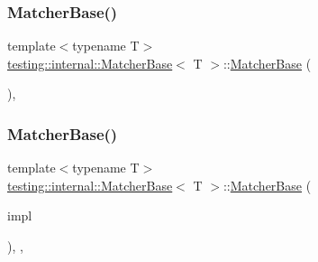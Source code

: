 \subsubsection{\texorpdfstring{Matcher\+Base()}{MatcherBase()}\hspace{0.1cm}{\footnotesize\ttfamily [1/2]}}
{\footnotesize\ttfamily template$<$typename T$>$ \\
\hyperlink{classtesting_1_1internal_1_1_matcher_base}{testing\+::internal\+::\+Matcher\+Base}$<$ T $>$\+::\hyperlink{classtesting_1_1internal_1_1_matcher_base}{Matcher\+Base} (\begin{DoxyParamCaption}{ }\end{DoxyParamCaption})\hspace{0.3cm}{\ttfamily [inline]}, {\ttfamily [protected]}}

\mbox{\label{classtesting_1_1internal_1_1_matcher_base_aed3e080f12ea7bde535ddf02b6f66922}} 
\subsubsection{\texorpdfstring{Matcher\+Base()}{MatcherBase()}\hspace{0.1cm}{\footnotesize\ttfamily [2/2]}}
{\footnotesize\ttfamily template$<$typename T$>$ \\
\hyperlink{classtesting_1_1internal_1_1_matcher_base}{testing\+::internal\+::\+Matcher\+Base}$<$ T $>$\+::\hyperlink{classtesting_1_1internal_1_1_matcher_base}{Matcher\+Base} (\begin{DoxyParamCaption}\item[{const \hyperlink{classtesting_1_1_matcher_interface}{Matcher\+Interface}$<$ T $>$ $\ast$}]{impl }\end{DoxyParamCaption})\hspace{0.3cm}{\ttfamily [inline]}, {\ttfamily [explicit]}, {\ttfamily [protected]}}

\mbox{\label{classtesting_1_1internal_1_1_matcher_base_a6f8cbfaa5fa9205f297d84fb1741d9c3}} 
